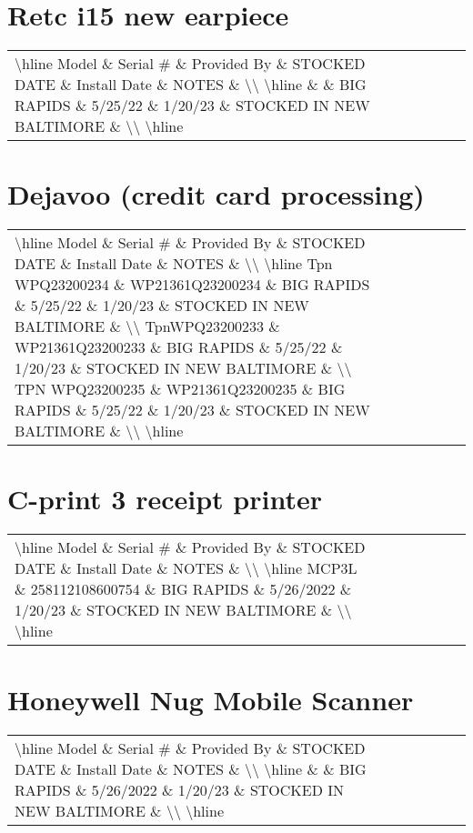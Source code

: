 \documentclass{article}%
\begin{document}
%
\section{Retc i15 new earpiece }%
\label{sec:Retci15newearpiece}%
\begin{tabularx}{\textwidth}{|X|X|X|X|X|X|X|}%
\textbackslash{}hline%
Model \& Serial \# \& Provided By \& STOCKED DATE \& Install Date \& NOTES \&  \textbackslash{}\textbackslash{}%
\textbackslash{}hline%
 \&  \& BIG RAPIDS \& 5/25/22 \& 1/20/23 \& STOCKED IN NEW BALTIMORE \&  \textbackslash{}\textbackslash{}%
\textbackslash{}hline%
\end{tabularx}

%
\section{Dejavoo (credit card processing)}%
\label{sec:Dejavoo(creditcardprocessing)}%
\begin{tabularx}{\textwidth}{|X|X|X|X|X|X|X|}%
\textbackslash{}hline%
Model \& Serial \# \& Provided By \& STOCKED DATE \& Install Date \& NOTES \&  \textbackslash{}\textbackslash{}%
\textbackslash{}hline%
Tpn WPQ23200234  \& WP21361Q23200234 \& BIG RAPIDS \& 5/25/22 \& 1/20/23 \& STOCKED IN NEW BALTIMORE \&  \textbackslash{}\textbackslash{}%
TpnWPQ23200233 \& WP21361Q23200233 \& BIG RAPIDS \& 5/25/22 \& 1/20/23 \& STOCKED IN NEW BALTIMORE \&  \textbackslash{}\textbackslash{}%
TPN WPQ23200235 \& WP21361Q23200235 \& BIG RAPIDS \& 5/25/22 \& 1/20/23 \& STOCKED IN NEW BALTIMORE \&  \textbackslash{}\textbackslash{}%
\textbackslash{}hline%
\end{tabularx}

%
\section{C{-}print 3 receipt printer}%
\label{sec:C{-}print3receiptprinter}%
\begin{tabularx}{\textwidth}{|X|X|X|X|X|X|X|}%
\textbackslash{}hline%
Model \& Serial \# \& Provided By \& STOCKED DATE \& Install Date \& NOTES \&  \textbackslash{}\textbackslash{}%
\textbackslash{}hline%
MCP3L \& 258112108600754 \& BIG RAPIDS \& 5/26/2022 \& 1/20/23 \& STOCKED IN NEW BALTIMORE \&  \textbackslash{}\textbackslash{}%
\textbackslash{}hline%
\end{tabularx}

%
\section{Honeywell Nug Mobile Scanner}%
\label{sec:HoneywellNugMobileScanner}%
\begin{tabularx}{\textwidth}{|X|X|X|X|X|X|X|}%
\textbackslash{}hline%
Model \& Serial \# \& Provided By \& STOCKED DATE \& Install Date \& NOTES \&  \textbackslash{}\textbackslash{}%
\textbackslash{}hline%
 \&  \& BIG RAPIDS \& 5/26/2022 \& 1/20/23 \& STOCKED IN NEW BALTIMORE \&  \textbackslash{}\textbackslash{}%
\textbackslash{}hline%
\end{tabularx}
\end{document}
